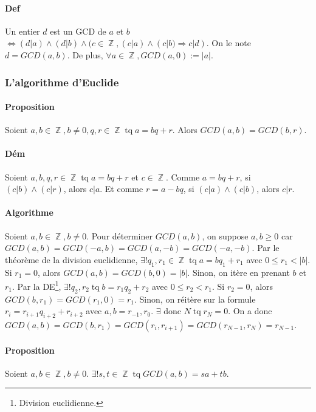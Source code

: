 \documentclass{article}
\DeclareMathOperator{\tq}{\text{ tq }}
\DeclareMathOperator{\Z}{\mathbb Z}
\begin{document}
			\paragraph{Def} Un entier $d$ est un GCD de $a$ et $b$ $\iff (d|a) \land (d|b) \land (c \in \Z, (c|a) \land (c|b) \Rightarrow c|d)$.
			On le note $d = GCD(a, b)$. De plus, $\forall a \in \Z, GCD(a, 0) := |a|$.

			\subsubsection{L'algorithme d'Euclide}

			\paragraph{Proposition} Soient $a, b \in \Z, b \neq 0, q, r \in \Z \tq a = bq + r$. Alors $GCD(a, b) = GCD(b, r)$.

			\paragraph{Dém} Soient $a, b, q, r \in \Z \tq a = bq + r$ et $c \in \Z$. Comme $a = bq +  r$, si $(c|b) \land (c|r)$,
			alors $c|a$. Et comme $r = a - bq$, si $(c|a) \land (c|b)$, alors $c|r$.

			\paragraph{Algorithme} Soient $a, b \in \Z, b \neq 0$. Pour déterminer $GCD(a, b)$, on suppose $a, b \geq 0$ car $GCD(a, b) =
			GCD(-a, b) = GCD(a, -b) = GCD(-a, -b)$. Par le théorème de la division euclidienne, $\exists! q_1, r_1 \in \Z \tq a = bq_1 + r_1$
			avec $0 \leq r_1 < |b|$. Si $r_1 = 0$, alors $GCD(a, b) = GCD(b, 0) = |b|$. Sinon, on itère en prenant $b$ et $r_1$. Par la
			DE\footnote{Division euclidienne.}, $\exists! q_2, r_2 \tq b = r_1q_2 + r_2$ avec $0 \leq r_2 < r_1$. Si $r_2 = 0$, alors
			$GCD(b, r_1) = GCD(r_1, 0) = r_1$. Sinon, on réitère sur la formule $r_i = r_{i+1}q_{i+2} + r_{i+2}$ avec $a, b = r_{-1}, r_0$. $\exists$
			donc $N \tq r_N = 0$. On a donc $GCD(a, b) = GCD(b, r_1) = GCD(r_i, r_{i+1}) = GCD(r_{N-1}, r_N) = r_{N-1}$.

			\paragraph{Proposition} Soient $a, b \in \Z, b \neq 0$. $\exists! s, t \in \Z \tq GCD(a, b) = sa + tb$.
\end{document}
